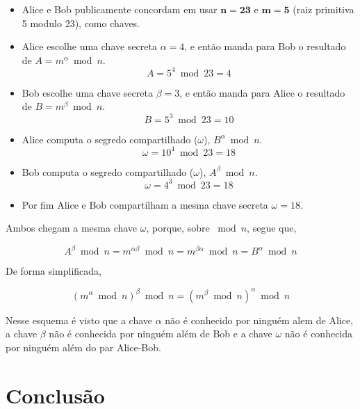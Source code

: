 \documentclass{article}
\begin{document}
\begin{itemize}
    \item Alice e Bob publicamente concordam em usar $\boldsymbol{n = 23}$ e
        $\boldsymbol{m = 5}$ (raiz primitiva 5 modulo 23), como chaves.
    \item Alice escolhe uma chave secreta $\alpha=4$, e então manda para Bob o
        resultado de $A = {m}^{\alpha}\bmod n$.
        \begin{equation}
            A = 5^4\bmod23 = 4
        \end{equation}
    \item Bob escolhe uma chave secreta $\beta=3$, e então manda para Alice o
        resultado de $B = {m}^{\beta}\bmod n$.
        \begin{equation}
            B = 5^3\bmod23 = 10
        \end{equation}
    \item Alice computa o segredo compartilhado ($\omega$), $B^\alpha \bmod n$.
        \begin{equation}
            \omega = 10^4\bmod23 = 18
        \end{equation}
    \item Bob computa o segredo compartilhado ($\omega$), $A^\beta \bmod n$.
        \begin{equation}
            \omega = 4^3\bmod23 = 18
        \end{equation}
    \item Por fim Alice e Bob compartilham a mesma chave secreta $\omega = 18$.
\end{itemize}

Ambos chegam a mesma chave $\omega$, porque, sobre $\bmod n$, segue que,

\begin{equation}
    A^{\beta}\bmod n = m^{\alpha\beta}\bmod n = m^{\beta\alpha}\bmod n = B^{\alpha}\bmod n
\end{equation}

De forma simplificada,

\begin{equation}
    (m ^\alpha \bmod n)^\beta \bmod n = (m^\beta \bmod n)^\alpha \bmod n
\end{equation}

Nesse esquema é visto que a chave $\alpha$ não é conhecido por ninguém alem de Alice,
a chave $\beta$ não é conhecida por ninguém além de Bob e a chave $\omega$ não
é conhecida por ninguém além do par Alice-Bob.

\section{Conclusão}%
\label{sec:conclusao}
\end{document}
